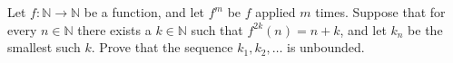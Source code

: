 Let 
$f: \mathbb{N} \rightarrow \mathbb{N}$
 be a function, and let 
$f^m$
 be 
$f$
 applied 
$m$
 times. Suppose that for every 
$n \in \mathbb{N}$
 there exists a 
$k \in \mathbb{N}$
 such that 
$f^{2k}(n)=n+k$, 
 and let 
$k_n$
 be the smallest such 
$k$.
 Prove that the sequence 
$k_1,k_2,\ldots $
 is unbounded.
